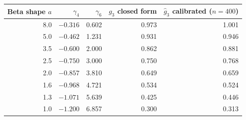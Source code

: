 \begin{tabular}{rrrrr}
\toprule
Beta shape $a$ & $\gamma_4$ & $\gamma_6$ & $g_3$ closed form & $\hat g_3$ calibrated ($n=400$) \\
\midrule
8.0 & $-0.316$ & 0.602 & 0.973 & 1.001 \\
5.0 & $-0.462$ & 1.231 & 0.931 & 0.946 \\
3.5 & $-0.600$ & 2.000 & 0.862 & 0.881 \\
2.5 & $-0.750$ & 3.000 & 0.750 & 0.768 \\
2.0 & $-0.857$ & 3.810 & 0.649 & 0.659 \\
1.6 & $-0.968$ & 4.721 & 0.534 & 0.524 \\
1.3 & $-1.071$ & 5.639 & 0.425 & 0.446 \\
1.0 & $-1.200$ & 6.857 & 0.300 & 0.313 \\
\bottomrule
\end{tabular}
